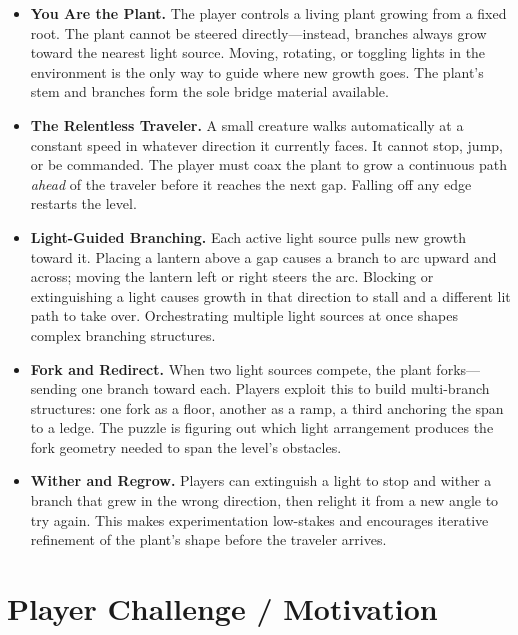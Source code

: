 \documentclass[11pt, letterpaper]{article}
\begin{document}
\begin{itemize}[leftmargin=1.5em, itemsep=3pt]

    \item \textbf{You Are the Plant.} The player controls a living plant growing from a fixed root.
    The plant cannot be steered directly---instead, branches always grow toward the nearest light
    source. Moving, rotating, or toggling lights in the environment is the only way to guide where
    new growth goes. The plant's stem and branches form the sole bridge material available.

    \item \textbf{The Relentless Traveler.} A small creature walks automatically at a constant
    speed in whatever direction it currently faces. It cannot stop, jump, or be commanded. The
    player must coax the plant to grow a continuous path \textit{ahead} of the traveler before it
    reaches the next gap. Falling off any edge restarts the level.

    \item \textbf{Light-Guided Branching.} Each active light source pulls new growth toward it.
    Placing a lantern above a gap causes a branch to arc upward and across; moving the lantern
    left or right steers the arc. Blocking or extinguishing a light causes growth in that direction
    to stall and a different lit path to take over. Orchestrating multiple light sources at once
    shapes complex branching structures.

    \item \textbf{Fork and Redirect.} When two light sources compete, the plant forks---sending
    one branch toward each. Players exploit this to build multi-branch structures: one fork as a
    floor, another as a ramp, a third anchoring the span to a ledge. The puzzle is figuring out
    which light arrangement produces the fork geometry needed to span the level's obstacles.

    \item \textbf{Wither and Regrow.} Players can extinguish a light to stop and wither a branch
    that grew in the wrong direction, then relight it from a new angle to try again. This makes
    experimentation low-stakes and encourages iterative refinement of the plant's shape before
    the traveler arrives.

\end{itemize}

\section*{Player Challenge / Motivation}
\end{document}

